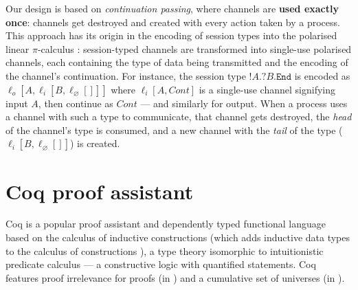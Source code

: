 \documentclass{mproj}
\newcommand{\picalc}{$\pi$-calculus}
\newcommand{\type}{\texttt}
\newcommand{\End}{\type{End}}
\newcommand{\Send}[1]{!#1.}
\newcommand{\Recv}[1]{?#1.}
\renewcommand{\emptyset}{\varnothing}
\begin{document}
\todo{}

Our design is based on \emph{continuation passing}, where channels are \textbf{used exactly once}: channels get destroyed and created with every action taken by a process. This approach has its origin in the encoding of session types into the polarised linear \picalc{} \cite{Kobayashi1999, Dardha2012, Dardha2017}: session-typed channels are transformed into single-use polarised channels, each containing the type of data being transmitted and the encoding of the channel's continuation. For instance, the session type $\Send{A} \Recv{B} \End$ is encoded as $\ell_o [A,\ell_i [B,\ell_\emptyset []]]$ where $\ell_i [A, Cont]$ is a single-use channel signifying input $A$, then continue as $Cont$ --- and similarly for output. When a process uses a channel with such a type to communicate, that channel gets destroyed, the \emph{head} of the channel's type is consumed, and a new channel with the \emph{tail} of the type ($\ell_i [B, \ell_\emptyset []]$) is created.

\cite{Kobayashi2003, Kobayashi2007, Dardha2017}


\section{Coq proof assistant}\label{coq}

Coq \cite{CoqDeveloperCommunity} is a popular proof assistant and dependently typed functional language based on the calculus of inductive constructions \cite{Coquand1989} (which adds inductive data types to the calculus of constructions \cite{Coquand1985}), a type theory isomorphic to intuitionistic predicate calculus --- a constructive logic with quantified statements.  Coq features proof irrelevance for proofs (in ) and a cumulative set of universes (in ).
\end{document}
